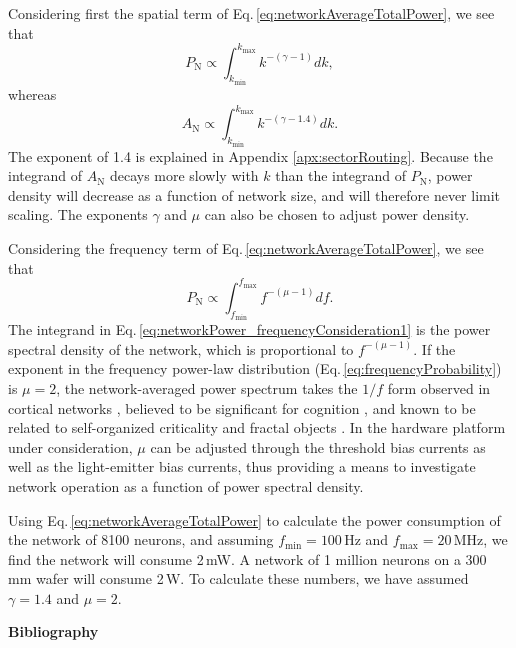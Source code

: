 \documentclass[aip,amsmath,amssymb,reprint,nofootinbib]{revtex4-1}
\begin{document}
Considering first the spatial term of Eq.\,\ref{eq:networkAverageTotalPower}, we see that 
\begin{equation}
\label{eq:networkPower_spatialConsideration1}
P_{\mathrm{N}} \propto \int_{k_{\mathrm{min}}}^{k_{\mathrm{max}}} k^{-(\gamma-1)}dk, 
\end{equation}
whereas
\begin{equation}
\label{eq:networkPower_spatialConsideration2}
A_{\mathrm{N}} \propto \int_{k_{\mathrm{min}}}^{k_{\mathrm{max}}} k^{-(\gamma-1.4)}dk. 
\end{equation}
The exponent of 1.4 is explained in Appendix \ref{apx:sectorRouting}. Because the integrand of $A_{\mathrm{N}}$ decays more slowly with $k$ than the integrand of $P_{\mathrm{N}}$, power density will decrease as a function of network size, and will therefore never limit scaling. The exponents $\gamma$ and $\mu$ can also be chosen to adjust power density.

Considering the frequency term of Eq.\,\ref{eq:networkAverageTotalPower}, we see that 
\begin{equation}
\label{eq:networkPower_frequencyConsideration1}
P_{\mathrm{N}} \propto \int_{f_{\mathrm{min}}}^{f_{\mathrm{max}}} f^{-(\mu-1)}df. 
\end{equation}
The integrand in Eq.\,\ref{eq:networkPower_frequencyConsideration1} is the power spectral density of the network, which is proportional to $ f^{-(\mu-1)}$. If the exponent in the frequency power-law distribution (Eq.\,\ref{eq:frequencyProbability}) is $\mu = 2$, the network-averaged power spectrum takes the $1/f$ form observed in cortical networks \cite{budr2004}, believed to be significant for cognition \cite{bu2006}, and known to be related to self-organized criticality and fractal objects \cite{be2007,bata1987,yara2017}. In the hardware platform under consideration, $\mu$ can be adjusted through the threshold bias currents as well as the light-emitter bias currents, thus providing a means to investigate network operation as a function of power spectral density.

Using Eq.\,\ref{eq:networkAverageTotalPower} to calculate the power consumption of the network of 8100 neurons, and assuming $f_{\mathrm{min}} = 100$\,Hz and $f_{\mathrm{max}} = 20$\,MHz, we find the network will consume 2\,mW. A network of 1 million neurons on a 300\,mm wafer will consume 2\,W. To calculate these numbers, we have assumed $\gamma = 1.4$ and $\mu  = 2$.

\newpage
\noindent\textbf{Bibliography}


\end{document}
